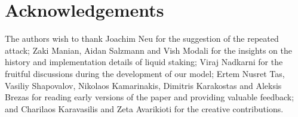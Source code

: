 \section{Acknowledgements}

The authors wish to thank Joachim Neu for the suggestion of the repeated attack;
Zaki Manian, Aidan Salzmann and Vish Modali for the insights on the history and
implementation details of liquid staking;
Viraj Nadkarni for the fruitful discussions during the
development of our model; Ertem Nusret Tas, Vasiliy Shapovalov,
Nikolaos Kamarinakis, Dimitris Karakostas and Aleksis Brezas for reading
early versions of the paper and providing valuable feedback; and Charilaos Karavasilis
and Zeta Avarikioti for the creative contributions.
